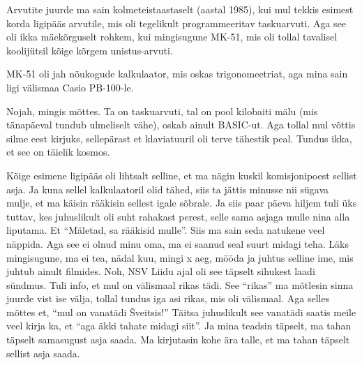 \label{sisu:tonu}


Arvutite juurde ma sain kolmeteistaastaselt (aastal 1985), kui mul tekkis esimest korda ligipääs arvutile, mis oli tegelikult programmeeritav taskuarvuti. Aga see oli ikka mäekõrguselt rohkem, kui mingisugune MK-51, mis oli tollal tavalisel koolijütsil kõige kõrgem unistus-arvuti. 


MK-51 oli jah nõukogude kalkulaator, mis oskas trigonomeetriat, aga mina sain ligi välismaa Casio PB-100-le. 


Nojah, mingis mõttes. Ta on taskuarvuti, tal on pool kilobaiti mälu (mis tänapäeval tundub ulmeliselt vähe), oskab ainult BASIC-ut. Aga tollal mul võttis silme eest kirjuks, sellepärast et klaviatuuril oli terve tähestik peal. Tundus ikka, et see on täielik kosmos. 


Kõige esimene ligipääs oli lihtsalt selline, et ma nägin kuskil komisjonipoest sellist asja. Ja kuna sellel kalkulaatoril olid tähed, siis ta jättis minusse nii sügava mulje, et ma käisin rääkisin sellest igale sõbrale. Ja siis paar päeva hiljem tuli üks tuttav, kes juhuslikult oli suht rahakast perest, selle sama asjaga mulle nina alla liputama. Et \enquote{Mäletad, sa rääkisid mulle}. Siis ma sain seda natukene veel näppida. Aga see ei olnud minu oma, ma ei saanud seal suurt midagi teha. Läks mingisugune, ma ei tea, nädal kuu, mingi x aeg, mööda ja juhtus selline ime, mis juhtub ainult filmides. Noh, NSV Liidu ajal oli see täpselt sihukest laadi sündmus. Tuli info, et mul on välismaal rikas tädi. See \enquote{rikas} ma mõtlesin sinna juurde vist ise välja, tollal tundus iga asi rikas, mis oli välismaal. Aga selles mõttes et, \enquote{mul on vanatädi Šveitsis!} Täitsa juhuslikult see vanatädi saatis meile veel kirja ka, et \enquote{aga äkki tahate midagi siit}. Ja mina teadsin täpselt, ma tahan täpselt samasugust asja saada. Ma kirjutasin kohe ära talle, et ma tahan täpselt sellist asja saada.

